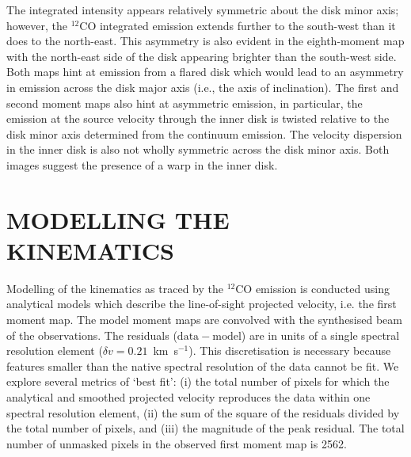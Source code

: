 \documentclass[onecolumn]{aastex6}
\newcommand{\kms}{km~s$^{-1}$}
\newcommand{\perbeam}{beam$^{-1}$}
\begin{document}
The integrated intensity appears relatively symmetric about the
disk minor axis; however, the $^{12}$CO integrated emission extends
further to the south-west than it does to the north-east.
This asymmetry is also evident in the eighth-moment map with the
north-east side of the disk appearing brighter than the south-west side.
Both maps hint at emission from a flared disk which would lead to an
asymmetry in emission across the disk major axis (i.e., the axis of inclination).
The first and second moment maps also hint at asymmetric emission, in particular,
the emission at the source velocity through the inner disk is twisted relative to the
disk minor axis determined from the continuum emission.
The velocity dispersion in the inner disk is also not wholly symmetric across
the disk minor axis.
Both images suggest the presence of a warp in the inner disk.

\begin{figure*}[ht]
\centering
{}
\caption{Moment maps for CO $\mathrm{J}=3-2$ line emission from HD 100546.  Clockwise from  top
left: zeroth moment map (integrated intensity, Jy~\perbeam), first moment map (intensity-weighted
velocity, \kms), eighth moment map (peak intensity, Jy~\perbeam), and second moment map
(intensity-weighted velocity dispersion, \kms).
The dashed contour in the second and eighth moment maps corresponds to the $3\sigma$ contour
of the integrated intensity.}
\label{figure3}
\end{figure*}

\section{MODELLING THE KINEMATICS}
\label{modelkinematics}

Modelling of the kinematics as traced by the $^{12}$CO emission is conducted
using analytical models which describe the line-of-sight projected velocity,
i.e. the first moment map.
The model moment maps are convolved with the synthesised beam of the observations.
The residuals ($\mathrm{data} - \mathrm{model}$) are in units of a single spectral
resolution element ($\delta v = 0.21$~\kms).
This discretisation is necessary because features smaller than the native spectral
resolution of the data cannot be fit.
We explore several metrics of `best fit':
(i) the total number of pixels for which the analytical and smoothed
projected velocity reproduces the data within one spectral resolution element,
(ii) the sum of the square of the residuals divided by the total number of pixels, and
(iii) the magnitude of the peak residual.
The total number of unmasked pixels in the observed first moment map is 2562.
\end{document}
